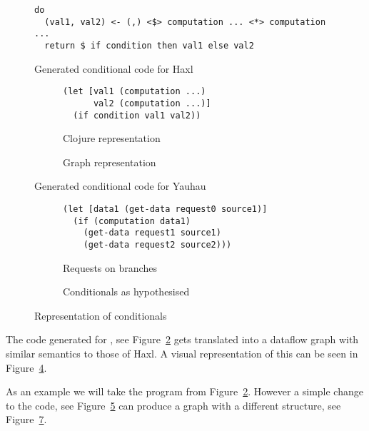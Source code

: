 \begin{figure}[h]
\begin{verbatim}
do
  (val1, val2) <- (,) <$> computation ... <*> computation ...
  return $ if condition then val1 else val2
\end{verbatim}
\caption{Generated conditional code for Haxl}
\label{fig:generated-conditional-haxl}
\end{figure}


\begin{figure}
  \begin{subfigure}[b]{.5\textwidth}
\begin{verbatim}
(let [val1 (computation ...)
      val2 (computation ...)]
  (if condition val1 val2))
\end{verbatim}
  \caption{Clojure representation}
  \label{fig:generated-conditional-yauhau}
  \end{subfigure}
  \begin{subfigure}[b]{0.5\textwidth}
    \caption{Graph representation}
    \label{fig:if-graph-actual}
  \end{subfigure}

  \caption{Generated conditional code for Yauhau}
\end{figure}

\begin{figure}
  \begin{subfigure}{\textwidth}
\begin{verbatim}
(let [data1 (get-data request0 source1)]
  (if (computation data1)
    (get-data request1 source1)
    (get-data request2 source2)))
\end{verbatim}
    \caption{Requests on branches}
    \label{fig:requests-on-branches}
  \end{subfigure}
  \begin{subfigure}{0.5\textwidth}
    \caption{Conditionals as hypothesised}
    \label{fig:if-graph-hypothesised}
  \end{subfigure}
  \caption{Representation of conditionals}
\end{figure}

The code generated for \yauhau{}, see Figure~\ref{fig:generated-conditional-yauhau} gets translated into a dataflow graph with similar semantics to those of Haxl.
A visual representation of this can be seen in Figure~\ref{fig:if-graph-actual}.

As an example we will take the program from Figure~\ref{fig:generated-conditional-yauhau}.
However a simple change to the \yauhau{} code, see Figure~\ref{fig:requests-on-branches} can produce a graph with a different structure, see Figure~\ref{fig:if-graph-hypothesised}.

